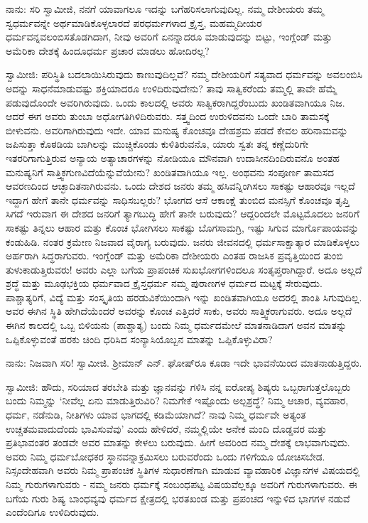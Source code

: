 ನಾನು: ಸರಿ ಸ್ವಾಮೀಜಿ, ನನಗೆ ಯಾವಾಗಲೂ ಇದನ್ನು ಬಗೆಹರಿಸಲಾಗುವುದಿಲ್ಲ. ನಮ್ಮ ದೇಶೀಯರು ತಮ್ಮ ಸ್ವಧರ್ಮವನ್ನೇ ಅರ್ಥಮಾಡಿಕೊಳ್ಳಲಾರದೆ ಪರಧರ್ಮಗಳಾದ ಕ್ರೈಸ್ತ, ಮಹಮ್ಮದೀಯರ ಧರ್ಮವನ್ನವಲಂಬಿಸತೊಡಗಿದಾಗ, ನೀವು ಅವರಿಗೆ ಏನನ್ನಾದರೂ ಮಾಡುವುದನ್ನು ಬಿಟ್ಟು, ಇಂಗ್ಲೆಂಡ್ ಮತ್ತು ಅಮೆರಿಕಾ ದೇಶಕ್ಕೆ ಹಿಂದೂಧರ್ಮ ಪ್ರಚಾರ ಮಾಡಲು ಹೋದಿರಲ್ಲ?

ಸ್ವಾಮೀಜಿ: ಪರಿಸ್ಥಿತಿ ಬದಲಾಯಿಸಿರುವುದು ಕಾಣುವುದಿಲ್ಲವೆ? ನಮ್ಮ ದೇಶೀಯರಿಗೆ ಸತ್ಯವಾದ ಧರ್ಮವನ್ನು ಅವಲಂಬಿಸಿ ಅದನ್ನು ಸಾಧನೆಮಾಡುವಷ್ಟು ಶಕ್ತಿಯಾದರೂ ಉಳಿದಿರುವುದೇನು? ತಾವು ಸಾತ್ವಿಕರೆಂದು ತಮ್ಮಲ್ಲಿ ತಾವೇ ಹೆಮ್ಮೆ ಪಡುವುದೊಂದೇ ಅವರಿಗಿರುವುದು. ಒಂದು ಕಾಲದಲ್ಲಿ ಅವರು ಸಾತ್ವಿಕರಾಗಿದ್ದರೆಂಬುದು ಖಂಡಿತವಾಗಿಯೂ ನಿಜ. ಆದರೆ ಈಗ ಅವರು ತುಂಬಾ ಅಧೋಗತಿಗಿಳಿದಿರುವರು. ಸತ್ತ್ವದಿಂದ ಉರುಳಿದವನು ಒಂದೇ ಬಾರಿ ತಾಮಸಕ್ಕೆ ಬೀಳುವನು. ಅವರಿಗಾಗಿರುವುದು ಇದೇ. ಯಾವ ಮನುಷ್ಯ ಕೊಂಚವೂ ದೇಹಶ್ರಮ ಪಡದೆ ಕೇವಲ ಹರಿನಾಮವನ್ನು ಜಪಿಸುತ್ತಾ ಕೊಠಡಿಯ ಬಾಗಿಲನ್ನು ಮುಚ್ಚಿಕೊಂಡು ಕುಳಿತಿರುವನೊ, ಯಾರು ಸ್ವತಃ ತನ್ನ ಕಣ್ಣೆದುರಿಗೇ ಇತರರಿಗಾಗುತ್ತಿರುವ ಅನ್ಯಾಯ ಅತ್ಯಾಚಾರಗಳನ್ನು ನೋಡಿಯೂ ಮೌನವಾಗಿ ಉದಾಸೀನದಿಂದಿರುವನೊ ಅಂತಹ ಮನುಷ್ಯನಿಗೆ ಸಾತ್ತ್ವಿಕಗುಣವಿದೆಯೆನ್ನುವೆಯೇನು? ಖಂಡಿತವಾಗಿಯೂ ಇಲ್ಲ. ಅಂಥವನು ಸಂಪೂರ್ಣ ತಾಮಸದ ಆವರಣದಿಂದ ಆಚ್ಛಾದಿತನಾಗಿರುವನು. ಒಂದು ದೇಶದ ಜನರು ತಮ್ಮ ಹಸಿವನ್ನಿಂಗಿಸಲು ಸಾಕಷ್ಟು ಆಹಾರವೂ ಇಲ್ಲದೆ ಇದ್ದಾಗ ಹೇಗೆ ತಾನೇ ಧರ್ಮವನ್ನು ಸಾಧಿಸಬಲ್ಲರು? ಭೋಗದ ಆಸೆ ಆಕಾಂಕ್ಷೆ ತುಂಬಿದ ಮನಸ್ಸಿಗೆ ಕೊಂಚವೂ ತೃಪ್ತಿ ಸಿಗದೆ ಇರುವಾಗ ಈ ದೇಶದ ಜನರಿಗೆ ತ್ಯಾಗಬುದ್ಧಿ ಹೇಗೆ ತಾನೇ ಬರುವುದು? ಆದ್ದರಿಂದಲೇ ಮೊಟ್ಟಮೊದಲು ಜನರಿಗೆ ಸಾಕಷ್ಟು ತಿನ್ನಲು ಆಹಾರ ಮತ್ತು ಕೊಂಚ ಭೋಗಿಸಲು ಸಾಕಷ್ಟು ಬೊಗಸಾಮಗ್ರಿ, ಇಷ್ಟು ಸಿಗುವ ಮಾರ್ಗೊಪಾಯವನ್ನು ಕಂಡುಹಿಡಿ. ನಂತರ ಕ್ರಮೇಣ ನಿಜವಾದ ವೈರಾಗ್ಯ ಬರುವುದು. ಜನರು ಜೀವನದಲ್ಲಿ ಧರ್ಮಸಾಕ್ಷಾತ್ಕಾರ ಮಾಡಿಕೊಳ್ಳಲು ಅರ್ಹರಾಗಿ ಸಿದ್ಧರಾಗುವರು. ಇಂಗ್ಲೆಂಡ್ ಮತ್ತು ಅಮೆರಿಕಾ ದೇಶೀಯರು ಎಂತಹ ರಾಜಸಿಕ ಪ್ರವೃತ್ತಿಯಿಂದ ತುಂಬಿ ತುಳುಕಾಡುತ್ತಿರುವರು! ಅವರು ಎಲ್ಲಾ ಬಗೆಯ ಪ್ರಾಪಂಚಿಕ ಸುಖಭೋಗಗಳಿಂದಲೂ ಸಂತೃಪ್ತರಾಗಿದ್ದಾರೆ. ಅದೂ ಅಲ್ಲದೆ ಶ್ರದ್ಧೆ ಮತ್ತು ಮೂಢಭಕ್ತಿಯ ಧರ್ಮವಾದ ಕ್ರೈಸ್ತಧರ್ಮ ನಮ್ಮ ಪುರಾಣಗಳ ಧರ್ಮದ ಮಟ್ಟಕ್ಕೆ ಸೇರುವುದು. ಪಾಶ್ಚಾತ್ಯರಿಗೆ, ವಿದ್ಯೆ ಮತ್ತು ಸಂಸ್ಕೃತಿಯ ಹರಡುವಿಕೆಯಿಂದಾಗಿ ಇನ್ನು ಖಂಡಿತವಾಗಿಯೂ ಅದರಲ್ಲಿ ಶಾಂತಿ ಸಿಗುವುದಿಲ್ಲ. ಅವರ ಈಗಿನ ಸ್ಥಿತಿ ಹೇಗಿದೆಯೆಂದರೆ ಅವರನ್ನು ಕೊಂಚ ಎತ್ತಿದರೆ ಸಾಕು, ಅವರು ಸಾತ್ತ್ವಿಕರಾಗುವರು. ಅದೂ ಅಲ್ಲದೆ ಈಗಿನ ಕಾಲದಲ್ಲಿ ಒಬ್ಬ ಬಿಳಿಯನು (ಪಾಶ್ಚಾತ್ಯ) ಬಂದು ನಿಮ್ಮ ಧರ್ಮದಮೇಲೆ ಮಾತನಾಡಿದಾಗ ಅವನ ಮಾತನ್ನು ಒಪ್ಪಿಕೊಳ್ಳುವಂತೆ ಹರಕು ಚಿಂದಿ ಧರಿಸಿದ ಸಂನ್ಯಾಸಿಯೊಬ್ಬನ ಮಾತನ್ನು ಒಪ್ಪಿಕೊಳ್ಳುವಿರಾ?

ನಾನು: ನಿಜವಾಗಿ ಸರಿ! ಸ್ವಾಮೀಜಿ. ಶ‍್ರೀಮಾನ್ ಎನ್. ಘೋಷ್‌ರೂ ಕೂಡಾ ಇದೇ ಭಾವನೆಯಿಂದ ಮಾತನಾಡುತ್ತಿದ್ದರು.

ಸ್ವಾಮೀಜಿ: ಹೌದು, ಸರಿಯಾದ ತರಬೇತಿ ಮತ್ತು ಜ್ಞಾನವನ್ನು ಗಳಿಸಿ ನನ್ನ ಐರೋಪ್ಯ ಶಿಷ್ಯರು ಒಬ್ಬರಾಗುತ್ತಲೊಬ್ಬರು ಬಂದು ನಿಮ್ಮನ್ನು ‘ನೀವೆಲ್ಲ ಏನು ಮಾಡುತ್ತಿರುವಿರಿ? ನಿಮಗೇಕೆ ಇಷ್ಟೊಂದು ಅಲ್ಪಶ್ರದ್ಧೆ? ನಿಮ್ಮ ಆಚಾರ, ವ್ಯವಹಾರ, ಧರ್ಮ, ನಡೆನುಡಿ, ನೀತಿಗಳು ಯಾವ ಭಾಗದಲ್ಲಿ ಕಡಿಮೆಯಾಗಿದೆ? ನಾವು ನಿಮ್ಮ ಧರ್ಮವೇ ಅತ್ಯಂತ ಉಚ್ಚತಮವಾದುದೆಂದು ಭಾವಿಸುವೆವು’ ಎಂದು ಹೇಳಿದರೆ, ನಮ್ಮಲ್ಲಿಯೇ ಅನೇಕ ಮಂದಿ ದೊಡ್ಡವರ ಮತ್ತು ಪ್ರತಿಭಾವಂತರ ತಂಡವೇ ಅವರ ಮಾತನ್ನು ಕೇಳಲು ಬರುವುದು. ಹೀಗೆ ಅವರಿಂದ ನಮ್ಮ ದೇಶಕ್ಕೆ ಲಾಭವಾಗುವುದು. ಅವರು ನಿಮ್ಮ ಧರ್ಮಬೋಧಕರ ಸ್ಥಾನವನ್ನಾಕ್ರಮಿಸಲು ಬರುವರೆಂದು ಒಂದು ಗಳಿಗೆಯೂ ಯೋಚಿಸಬೇಡ. ನಿಸ್ಸಂದೇಹವಾಗಿ ಅವರು ನಿಮ್ಮ ಪ್ರಾಪಂಚಿಕ ಸ್ಥಿತಿಗಳ ಸುಧಾರಣೆಗಾಗಿ ಮಾಡುವ ವ್ಯಾವಹಾರಿಕ ವಿಜ್ಞಾನಗಳ ವಿಷಯದಲ್ಲಿ ನಿಮ್ಮ ಗುರುಗಳಾಗುವರು - ನಮ್ಮ ಜನರು ಧರ್ಮಕ್ಕೆ ಸಂಬಂಧಪಟ್ಟ ವಿಷಯವೆಲ್ಲಕ್ಕೂ ಅವರಿಗೆ ಗುರುಗಳಾಗುವರು. ಈ ಬಗೆಯ ಗುರು ಶಿಷ್ಯ ಬಾಂಧವ್ಯವು ಧರ್ಮದ ಕ್ಷೇತ್ರದಲ್ಲಿ ಭರತಖಂಡ ಮತ್ತು ಪ್ರಪಂಚದ ಇನ್ನುಳಿದ ಭಾಗಗಳ ನಡುವೆ ಎಂದೆಂದಿಗೂ ಉಳಿದಿರುವುದು.

